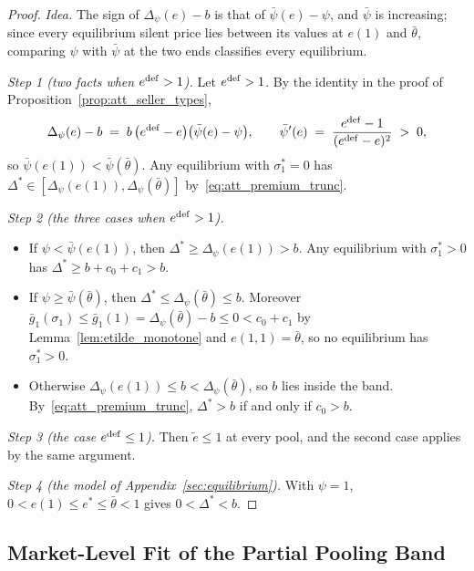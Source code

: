 \begin{proof}\upshape
\emph{Idea.} The sign of $\Delta_\psi(e)-b$ is that of $\bar\psi(e)-\psi$, and $\bar\psi$ is increasing; since every equilibrium silent price lies between its values at $e(1)$ and $\bar\theta$, comparing $\psi$ with $\bar\psi$ at the two ends classifies every equilibrium.

\emph{Step 1 (two facts when $e^{\rm def}>1$).} Let $e^{\rm def}>1$. By the identity in the proof of Proposition~\ref{prop:att_seller_types},
\begin{equation*}
    \Delta_\psi(e)-b\;=\;b\,\big(e^{\rm def}-e\big)\big(\bar\psi(e)-\psi\big),\qquad
    \bar\psi'(e)\;=\;\frac{e^{\rm def}-1}{(e^{\rm def}-e)^2}\;>\;0,
\end{equation*}
so $\bar\psi(e(1))<\bar\psi(\bar\theta)$. Any equilibrium with $\sigma_1^*=0$ has $\Delta^*\in[\Delta_\psi(e(1)),\Delta_\psi(\bar\theta)]$ by~\eqref{eq:att_premium_trunc}.

\emph{Step 2 (the three cases when $e^{\rm def}>1$).}
\begin{itemize}
    \item If $\psi<\bar\psi(e(1))$, then $\Delta^*\ge\Delta_\psi(e(1))>b$. Any equilibrium with $\sigma_1^*>0$ has $\Delta^*\ge b+c_0+c_1>b$.
    \item If $\psi\ge\bar\psi(\bar\theta)$, then $\Delta^*\le\Delta_\psi(\bar\theta)\le b$. Moreover $\bar g_1(\sigma_1)\le\bar g_1(1)=\Delta_\psi(\bar\theta)-b\le0<c_0+c_1$ by Lemma~\ref{lem:etilde_monotone} and $e(1,1)=\bar\theta$, so no equilibrium has $\sigma_1^*>0$.
    \item Otherwise $\Delta_\psi(e(1))\le b<\Delta_\psi(\bar\theta)$, so $b$ lies inside the band. By~\eqref{eq:att_premium_trunc}, $\Delta^*>b$ if and only if $c_0>b$.
\end{itemize}

\emph{Step 3 (the case $e^{\rm def}\le1$).} Then $\tilde e\le1$ at every pool, and the second case applies by the same argument.

\emph{Step 4 (the model of Appendix~\ref{sec:equilibrium}).} With $\psi=1$, $0<e(1)\le e^*\le\bar\theta<1$ gives $0<\Delta^*<b$.
\end{proof}

\subsection*{Market-Level Fit of the Partial Pooling Band}
\label{app:att_band_fit}

